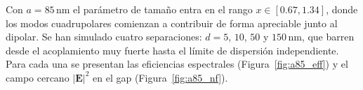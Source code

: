 

Con $a=85\,\text{nm}$ el parámetro de tamaño entra en el rango $x\in[0.67,1.34]$,
donde los modos cuadrupolares comienzan a contribuir de forma apreciable junto
al dipolar. Se han simulado cuatro separaciones: $d=5$, $10$, $50$ y
$150\,\text{nm}$, que barren desde el acoplamiento muy fuerte hasta el límite
de dispersión independiente. Para cada una se presentan las eficiencias
espectrales (Figura~\ref{fig:a85_eff}) y el campo cercano $|\mathbf{E}|^2$ en
el gap (Figura~\ref{fig:a85_nf}).

